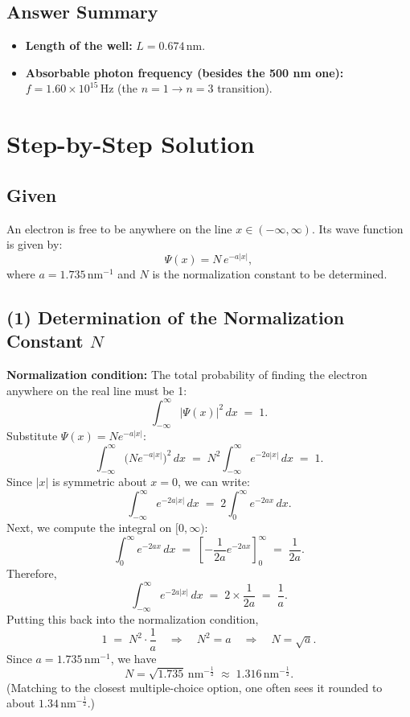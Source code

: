 \documentclass[12pt]{article}
\theoremstyle{definition} %
\theoremstyle{plain} %
\begin{document}
\subsection*{Answer Summary}

\begin{itemize}
    \item \textbf{Length of the well:} $L = 0.674\,\mathrm{nm}$.
    \item \textbf{Absorbable photon frequency (besides the 500 nm one):} 
          $f = 1.60\times 10^{15}\,\mathrm{Hz}$ (the $n=1 \to n=3$ transition).
\end{itemize}



\section*{Step-by-Step Solution}

\subsection*{Given}
An electron is free to be anywhere on the line \(x \in (-\infty,\infty)\). Its wave function is given by:
\[
\Psi(x) = N\, e^{-a|x|},
\]
where \(a = 1.735\,\mathrm{nm}^{-1}\) and \(N\) is the normalization constant to be determined.

\subsection*{(1) Determination of the Normalization Constant \(N\)}

\noindent
\textbf{Normalization condition:} The total probability of finding the electron anywhere on the real line must be 1:
\[
\int_{-\infty}^{\infty} \bigl|\Psi(x)\bigr|^2 \, dx \;=\; 1.
\]
Substitute \(\Psi(x) = N e^{-a|x|}\):
\[
\int_{-\infty}^{\infty} \bigl(N e^{-a|x|}\bigr)^2 \, dx 
\;=\; 
N^2 \int_{-\infty}^{\infty} e^{-2a|x|} \, dx 
\;=\; 1.
\]
Since \(|x|\) is symmetric about \(x=0\), we can write:
\[
\int_{-\infty}^{\infty} e^{-2a|x|}\, dx 
\;=\; 
2 \int_{0}^{\infty} e^{-2ax}\, dx.
\]
Next, we compute the integral on \([0,\infty)\):
\[
\int_{0}^{\infty} e^{-2ax}\, dx 
\;=\;
\left[
-\frac{1}{2a} e^{-2ax}
\right]_{0}^{\infty} 
\;=\; 
\frac{1}{2a}.
\]
Therefore,
\[
\int_{-\infty}^{\infty} e^{-2a|x|}\, dx 
\;=\; 
2 \times \frac{1}{2a} 
\;=\; 
\frac{1}{a}.
\]
Putting this back into the normalization condition,
\[
1 \;=\; N^2 \cdot \frac{1}{a}
\quad\Longrightarrow\quad
N^2 = a
\quad\Longrightarrow\quad
N = \sqrt{a}.
\]
Since \(a = 1.735\,\mathrm{nm}^{-1}\), we have
\[
N = \sqrt{1.735}\,\mathrm{nm}^{-\tfrac12} \;\approx\; 1.316\,\mathrm{nm}^{-\tfrac12}.
\]
(Matching to the closest multiple-choice option, one often sees it rounded to about \(1.34\,\mathrm{nm}^{-\tfrac12}\).)
\end{document}
